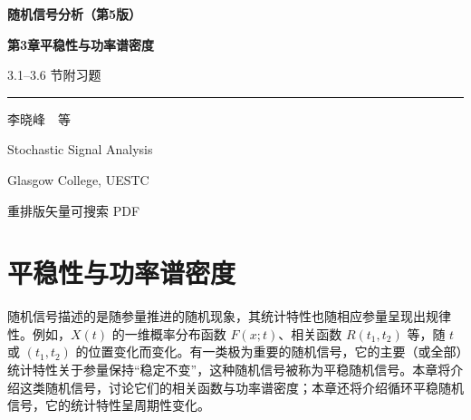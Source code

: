 \documentclass[11pt,openany,UTF8]{ctexbook}
\begin{document}
\begin{titlepage}
  \centering
  \vspace*{2.6cm}
  {\bfseries 随机信号分析（第5版\nobreak）\par}
  \vspace{1.0cm}
  {\bfseries 第3章\quad 平稳性与功率谱密度\par}
  \vspace{0.5cm}
  { 3.1–3.6 节\quad 附\quad 习题\par}
  \vspace{1.1cm}
  \rule{0.5\textwidth}{0.6pt}\par
  \vspace{1.1cm}
  { 李晓峰　等\par}
  \vfill
  { Stochastic Signal Analysis\par}
  \vspace{0.25cm}
  { Glasgow College, UESTC\par}
  \vspace{1.2cm}
  { 重排版\quad\textperiodcentered\quad 矢量可搜索 PDF\par}
  \vspace{1.6cm}
\end{titlepage}

\tableofcontents
\thispagestyle{empty}
\clearpage
\setcounter{page}{1}

\setcounter{chapter}{2}
\chapter{平稳性与功率谱密度}


随机信号描述的是随参量推进的随机现象\nobreak，其统计特性也随相应参量呈现出规律性\nobreak。例如\nobreak，$X(t)$ 的一维概率分布函数 $F(x;t)$\nobreak、相关函数 $R(t_1,t_2)$ 等\nobreak，随 $t$ 或 $(t_1,t_2)$ 的位置变化而变化\nobreak。有一类极为重要的随机信号\nobreak，它的主要（或全部\nobreak）统计特性关于参量保持“稳定不变”\nobreak，这种随机信号被称为平稳随机信号\nobreak。本章将介绍这类随机信号\nobreak，讨论它们的相关函数与功率谱密度\nobreak；本章还将介绍循环平稳随机信号\nobreak，它的统计特性呈周期性变化\nobreak。
\end{document}
